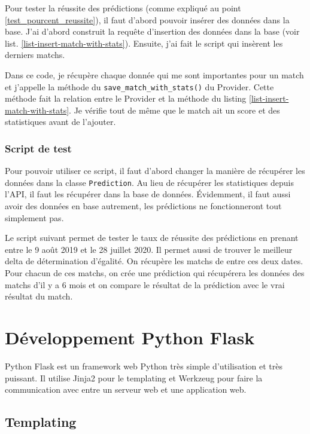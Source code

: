 \documentclass[a4paper,14pt]{extarticle}
\begin{document}
{Pour tester la réussite des prédictions (comme expliqué au point \ref{test_pourcent_reussite}), il faut d'abord pouvoir insérer des données dans la base. J'ai d'abord construit la requête d'insertion des données dans la base (voir list. \ref{list-insert-match-with-stats}). Ensuite, j'ai fait le script qui insèrent les derniers matchs.


Dans ce code, je récupère chaque donnée qui me sont importantes pour un match et j'appelle la méthode du \texttt{save\_match\_with\_stats()} du Provider. Cette méthode fait la relation entre le Provider et la méthode du listing \ref{list-insert-match-with-stats}. Je vérifie tout de même que le match ait un score et des statistiques avant de l'ajouter.

\subsubsection{Script de test}
Pour pouvoir utiliser ce script, il faut d'abord changer la manière de récupérer les données dans la classe \texttt{Prediction}. Au lieu de récupérer les statistiques depuis l'API, il faut les récupérer dans la base de données. Évidemment, il faut aussi avoir des données en base autrement, les prédictions ne fonctionneront tout simplement pas.

Le script suivant permet de tester le taux de réussite des prédictions en prenant entre le 9 août 2019 et le 28 juillet 2020. Il permet aussi de trouver le meilleur delta de détermination d'égalité. On récupère les matchs de entre ces deux dates. Pour chacun de ces matchs, on crée une prédiction qui récupérera les données des matchs d'il y a 6 mois et on compare le résultat de la prédiction avec le vrai résultat du match.

\section{Développement Python Flask}

Python Flask est un framework web Python très simple d'utilisation et très puissant. Il utilise Jinja2 pour le templating et Werkzeug pour faire la communication avec entre un serveur web et une application web. 

\subsection{Templating}

}
\end{document}
